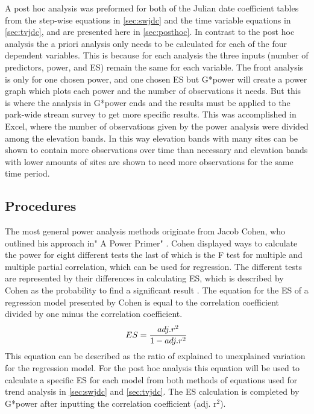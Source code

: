 A post hoc analysis was preformed for both of the Julian date coefficient tables from the step-wise equations in \autoref{sec:swjdc} and the time variable equations in \autoref{sec:tvjdc}, and are presented here in \autoref{sec:posthoc}.
In contrast to the post hoc analysis the a priori analysis only needs to be calculated for each of the four dependent variables.
This is because for each analysis the three inputs (number of predictors, power, and ES) remain the same for each variable.
The front analysis is only for one chosen power, and one chosen ES but G*power will create a power graph which plots each power and the number of observations it needs.
But this is where the analysis in G*power ends and the results must be applied to the park-wide stream survey to get more specific results.
This was accomplished in Excel, where the number of observations given by the power analysis were divided among the elevation bands.
In this way elevation bands with many sites can be shown to contain more observations over time than necessary and elevation bands with lower amounts of sites are shown to need more observations for the same time period.

\subsection{Procedures}

The most general power analysis methods originate from Jacob Cohen, who outlined his approach in" A Power Primer" \citep{cohen1992power}.
Cohen displayed ways to calculate the power for eight different tests the last of which is the F test for multiple and multiple partial correlation, which can be used for regression.
The different tests are represented by their differences in calculating ES, which is described by Cohen as the probability to find a significant result \citep{cohen1992power}.
The equation for the ES of a regression model presented by Cohen is equal to the correlation coefficient divided by one minus the correlation coefficient.
\begin{equation} \label{eq:ES}
    ES = {adj. r^2 \over {1-adj. r^2}}
\end{equation}
This equation can be described as the ratio of explained to unexplained variation for the regression model.
For the post hoc analysis this equation will be used to calculate a specific ES for each model from both methods of equations used for trend analysis in \autoref{sec:swjdc} and \autoref{sec:tvjdc}.
The ES calculation is completed by G*power after inputting the correlation coefficient (adj. r$^2$).

